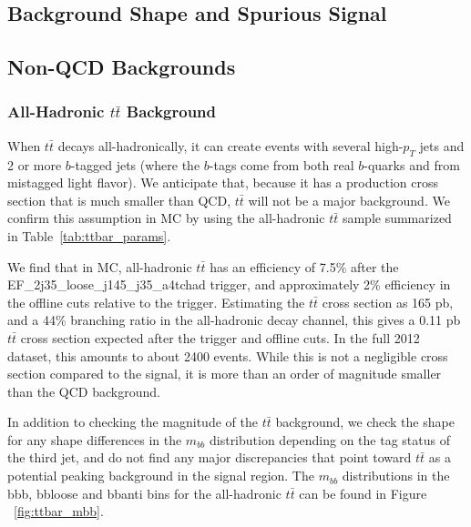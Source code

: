 \subsection{Background Shape and Spurious Signal}
\cite{spurious_signal}












\subsection{Non-QCD Backgrounds}
\label{sec:non_qcd_bkgs}

\subsubsection{All-Hadronic $t\bar{t}$ Background}
When $t\bar{t}$ decays all-hadronically, it can create events with several high-$p_T$
jets and 2 or more $b$-tagged jets (where the $b$-tags come from both real $b$-quarks
and from mistagged light flavor).  We anticipate that, because it has a production
cross section that is much smaller than QCD, $t\bar{t}$ will not be a major background.
We confirm this assumption in MC by using the all-hadronic $t\bar{t}$ sample summarized
in Table~\ref{tab:ttbar_params}.


We find that in MC, all-hadronic $t\bar{t}$ has an efficiency of 7.5\% after
the EF\_2j35\_loose\_j145\_j35\_a4tchad trigger, and approximately 2\% efficiency
in the offline cuts relative to the trigger.  Estimating the $t\bar{t}$ cross section
as 165 pb, and a 44\% branching ratio in the all-hadronic decay channel, this gives
a 0.11 pb $t\bar{t}$ cross section expected after the trigger and offline cuts.  In the
full 2012 dataset, this amounts to about 2400 events.  While
this is not a negligible cross section compared to the signal, it is more than an
order of magnitude smaller than the QCD background.

In addition to checking the magnitude of the $t\bar{t}$ background, we check the shape
for any shape differences in the $m_{bb}$ distribution depending on the tag status of the
third jet, and do not find any major discrepancies that point toward $t\bar{t}$ as a
potential peaking background in the signal region. The $m_{bb}$ distributions in the
bbb, bbloose and bbanti bins for the all-hadronic $t\bar{t}$ can be found in Figure
~\ref{fig:ttbar_mbb}.




